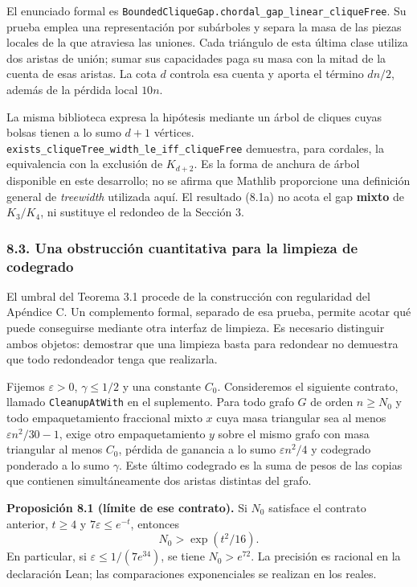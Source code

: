 \documentclass[spanish,11pt,a4paper]{article}
\begin{document}
El enunciado formal es \nolinkurl{BoundedCliqueGap.chordal_gap_linear_cliqueFree}. Su prueba emplea una representación por subárboles y separa la masa de las piezas locales de la que atraviesa las uniones. Cada triángulo de esta última clase utiliza dos aristas de unión; sumar sus capacidades paga su masa con la mitad de la cuenta de esas aristas. La cota \(d\) controla esa cuenta y aporta el término \(dn/2\), además de la pérdida local \(10n\).

La misma biblioteca expresa la hipótesis mediante un árbol de cliques cuyas bolsas tienen a lo sumo \(d+1\) vértices. \nolinkurl{exists_cliqueTree_width_le_iff_cliqueFree} demuestra, para cordales, la equivalencia con la exclusión de \(K_{d+2}\). Es la forma de anchura de árbol disponible en este desarrollo; no se afirma que Mathlib proporcione una definición general de \emph{treewidth} utilizada aquí. El resultado (8.1a) no acota el gap \textbf{mixto} de \(K_3/K_4\), ni sustituye el redondeo de la Sección 3.

\subsubsection{8.3. Una obstrucción cuantitativa para la limpieza de codegrado}\label{una-obstrucciuxf3n-cuantitativa-para-la-limpieza-de-codegrado}

El umbral del Teorema 3.1 procede de la construcción con regularidad del Apéndice C. Un complemento formal, separado de esa prueba, permite acotar qué puede conseguirse mediante otra interfaz de limpieza. Es necesario distinguir ambos objetos: demostrar que una limpieza basta para redondear no demuestra que todo redondeador tenga que realizarla.

Fijemos \(\varepsilon>0\), \(\gamma\le1/2\) y una constante \(C_0\). Consideremos el siguiente contrato, llamado \nolinkurl{CleanupAtWith} en el suplemento. Para todo grafo \(G\) de orden \(n\ge N_0\) y todo empaquetamiento fraccional mixto \(x\) cuya masa triangular sea al menos \(\varepsilon n^2/30-1\), exige otro empaquetamiento \(y\) sobre el mismo grafo con masa triangular al menos \(C_0\), pérdida de ganancia a lo sumo \(\varepsilon n^2/4\) y codegrado ponderado a lo sumo \(\gamma\). Este último codegrado es la suma de pesos de las copias que contienen simultáneamente dos aristas distintas del grafo.


\textbf{Proposición 8.1 (límite de ese contrato).} Si \(N_0\) satisface el contrato anterior, \(t\ge4\) y \(7\varepsilon\le e^{-t}\), entonces \[
N_0>\exp(t^2/16).
\tag{8.2}
\] En particular, si \(\varepsilon\le1/(7e^{34})\), se tiene \(N_0>e^{72}\). La precisión es racional en la declaración Lean; las comparaciones exponenciales se realizan en los reales.
\end{document}
